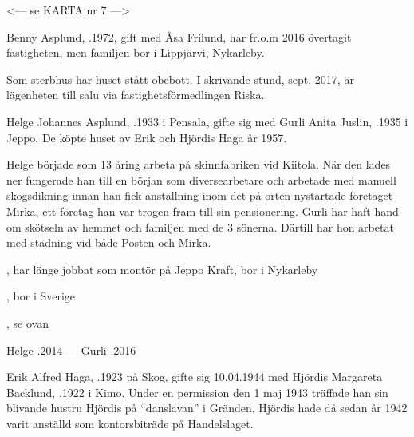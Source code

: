 
<--- se KARTA nr 7 --->



%


%
Benny Asplund, .1972, gift med Åsa Frilund, har fr.o.m 2016 övertagit fastigheten, men familjen bor i Lippjärvi, Nykarleby. \jhvspace{}


%
Som sterbhus har huset stått obebott. I skrivande stund, sept. 2017, är lägenheten till salu via fastighetsförmedlingen Riska. \jhvspace{}



%
Helge Johannes Asplund, .1933 i Pensala, gifte sig med Gurli Anita Juslin, .1935 i Jeppo. De köpte huset av Erik och Hjördis Haga år 1957.

Helge började som 13 åring arbeta på skinnfabriken vid Kiitola. När den lades ner fungerade han till en början som diversearbetare och arbetade med manuell skogsdikning innan han fick anställning inom det på orten nystartade företaget Mirka, ett företag han var trogen fram till sin pensionering. Gurli har haft hand om skötseln av hemmet och familjen med de 3 sönerna. Därtill har hon arbetat med städning vid både Posten och Mirka.
\begin{jhchildren}
  \item {}, har länge jobbat som montör på Jeppo Kraft, bor i Nykarleby
  \item {}, bor i Sverige
  \item {}, se ovan
\end{jhchildren}

Helge .2014  ---  Gurli .2016


%
Erik Alfred Haga, .1923 på Skog, gifte sig 10.04.1944 med Hjördis Margareta Backlund, .1922 i Kimo. Under en permission den 1 maj 1943 träffade han sin blivande hustru Hjördis på ``danslavan'' i Gränden. Hjördis hade då sedan år 1942 varit anställd som kontorsbiträde på Handelslaget.

